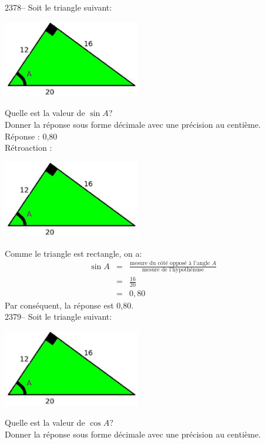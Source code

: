 \documentclass[letterpaper, 12pt]{article}
\begin{document}
2378-- Soit le triangle suivant:
\begin{center}
 \includegraphics[width=6cm,bb=14 14 415 315]{Q2378.eps}
\end{center}
Quelle est la valeur de $\sin{A}$?\\
Donner la r\'eponse sous forme d\'ecimale avec une pr\'ecision au centi\`eme.\\

R\'eponse : 0,80\\

R\'etroaction :\\
\begin{center}
 \includegraphics[width=6cm,bb=14 14 415 315]{Q2378.eps}
\end{center}
Comme le triangle est rectangle, on a:
\begin{eqnarray*}
 \sin{A}&=&\frac{\textrm{mesure du c\^ot\'e oppos\'e \`a l'angle $A$}}{\textrm{mesure de l'hypoth\'enuse}}\\
&=&\frac{16}{20}\\[2mm]
&=&0,80
\end{eqnarray*}
Par cons\'equent, la r\'eponse est 0,80.\\

2379--  Soit le triangle suivant:
\begin{center}
 \includegraphics[width=6cm,bb=14 14 415 315]{Q2378.eps}
\end{center}
Quelle est la valeur de $\cos{A}$?\\
Donner la r\'eponse sous forme d\'ecimale avec une pr\'ecision au centi\`eme.\\
\end{document}

